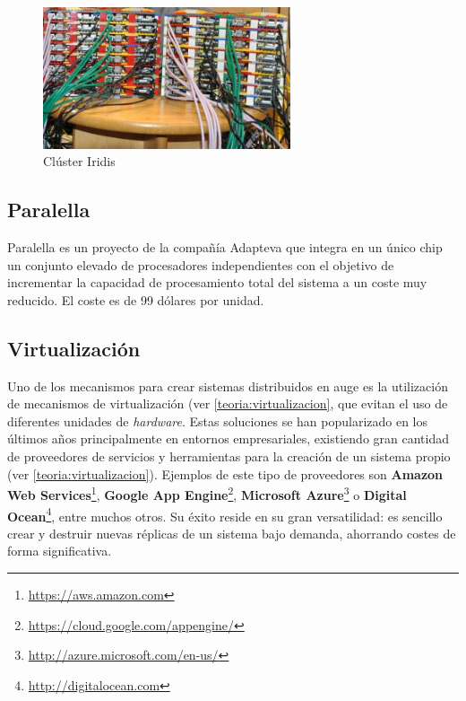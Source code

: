 \begin{figure}[H]
  \centering
  \includegraphics[width=0.65\textwidth]{Chapters/Chapter4/Figures/iridis-pi.jpg}
  \caption[Iridis]{Clúster Iridis}
  \label{cox:iridis}
\end{figure}

\subsection{Paralella}

Paralella es un proyecto de la compañía Adapteva que integra en un único chip un conjunto elevado de procesadores independientes con el objetivo de incrementar la capacidad de procesamiento total del sistema a un coste muy reducido\cite{paralella}. El coste es de 99 dólares por unidad.

\subsection{Virtualización}

Uno de los mecanismos para crear sistemas distribuidos en auge es la utilización de mecanismos de virtualización (ver \ref{teoria:virtualizacion}, que evitan el uso de diferentes unidades de \textit{hardware}. Estas soluciones se han popularizado en los últimos años principalmente en entornos empresariales, existiendo gran cantidad de proveedores de servicios y herramientas para la creación de un sistema propio (ver \ref{teoria:virtualizacion}). Ejemplos de este tipo de proveedores son \textbf{Amazon Web Services}\footnote{\href{http://aws.amazon.com/}{https://aws.amazon.com}}, \textbf{Google App Engine}\footnote{\href{https://cloud.google.com/appengine/}{https://cloud.google.com/appengine/}}, \textbf{Microsoft Azure}\footnote{\href{http://azure.microsoft.com/}{http://azure.microsoft.com/en-us/}} o \textbf{Digital Ocean}\footnote{\href{http://digitalocean.com}{http://digitalocean.com}}, entre muchos otros. Su éxito reside en su gran versatilidad: es sencillo crear y destruir nuevas réplicas de un sistema bajo demanda, ahorrando costes de forma significativa.

